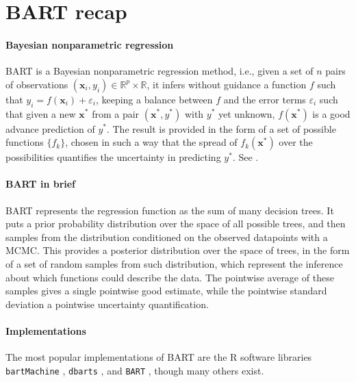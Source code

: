 \documentclass{article}
\begin{document}
    \section{BART recap}

    \paragraph{Bayesian nonparametric regression}

    BART is a Bayesian nonparametric regression method, i.e., given a set of $n$ pairs of observations $(\mathbf x_i,y_i) \in \mathbb R^p \times \mathbb R$, it infers without guidance a function $f$ such that $y_i = f(\mathbf x_i) + \varepsilon_i$, keeping a balance between $f$ and the error terms $\varepsilon_i$ such that given a new $\mathbf x^*$ from a pair $(\mathbf x^*, y^*)$ with $y^*$ yet unknown, $f(\mathbf x^*)$ is a good advance prediction of $y^*$. The result is provided in the form of a set of possible functions $\{f_k\}$, chosen in such a way that the spread of $f_k(\mathbf x^*)$ over the possibilities quantifies the uncertainty in predicting $y^*$. See \textcite[ch.~4]{muller2015}.

    \paragraph{BART in brief}

    BART represents the regression function as the sum of many decision trees. It puts a prior probability distribution over the space of all possible trees, and then samples from the distribution conditioned on the observed datapoints with a MCMC. This provides a posterior distribution over the space of trees, in the form of a set of random samples from such distribution, which represent the inference about which functions could describe the data. The pointwise average of these samples gives a single pointwise good estimate, while the pointwise standard deviation a pointwise uncertainty quantification.

    \paragraph{Implementations}

    The most popular implementations of BART are the R software libraries \texttt{bartMachine} \autocite{kapelner2016,kapelner2023}, \texttt{dbarts} \autocite{dorie2024}, and \texttt{BART} \autocite{sparapani2021,mcculloch2024}, though many others exist.
\end{document}
